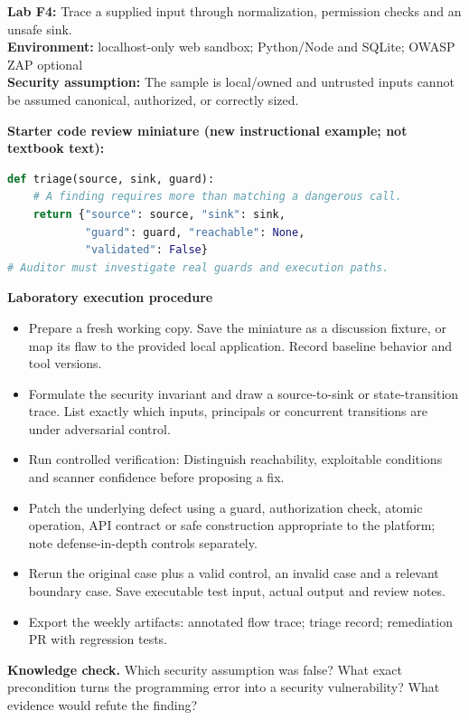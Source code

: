 \documentclass[10pt,letterpaper]{article}
\begin{document}
\begin{insight}\textbf{Lab F4:} Trace a supplied input through normalization, permission checks and an unsafe sink.\\\textbf{Environment:} localhost-only web sandbox; Python/Node and SQLite; OWASP ZAP optional\\\textbf{Security assumption:} The sample is local/owned and untrusted inputs cannot be assumed canonical, authorized, or correctly sized.\end{insight}
\textbf{Starter code review miniature (new instructional example; not textbook text):}
\begin{lstlisting}[language=Python]
def triage(source, sink, guard):
    # A finding requires more than matching a dangerous call.
    return {"source": source, "sink": sink,
            "guard": guard, "reachable": None,
            "validated": False}
# Auditor must investigate real guards and execution paths.
\end{lstlisting}
\textbf{Laboratory execution procedure}
\begin{itemize}[leftmargin=*,itemsep=2pt]
\item Prepare a fresh working copy. Save the miniature as a discussion fixture, or map its flaw to the provided local application. Record baseline behavior and tool versions.
\item Formulate the security invariant and draw a source-to-sink or state-transition trace. List exactly which inputs, principals or concurrent transitions are under adversarial control.
\item Run controlled verification: Distinguish reachability, exploitable conditions and scanner confidence before proposing a fix.
\item Patch the underlying defect using a guard, authorization check, atomic operation, API contract or safe construction appropriate to the platform; note defense-in-depth controls separately.
\item Rerun the original case plus a valid control, an invalid case and a relevant boundary case. Save executable test input, actual output and review notes.
\item Export the weekly artifacts: annotated flow trace; triage record; remediation PR with regression tests.
\end{itemize}
\textbf{Knowledge check.} Which security assumption was false? What exact precondition turns the programming error into a security vulnerability? What evidence would refute the finding?
\end{document}
